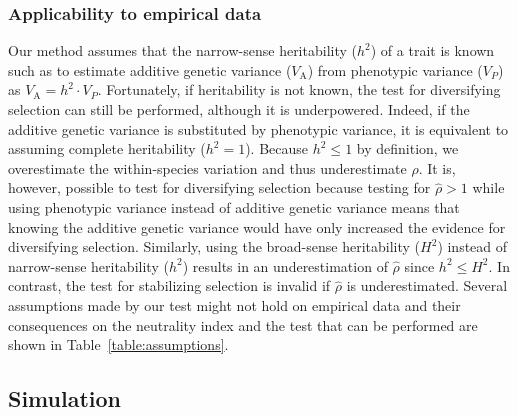 \documentclass{article}
\newcommand{\Multiply}{\cdot}
\newcommand{\Trait}{P}
\newcommand{\Heritability}{h^2}
\newcommand{\VarPhenotype}{V_{\Trait}}
\newcommand{\VarGenetic}{V_{\mathrm{A}}}
\newcommand{\EstNI}{\widehat{\rho}}
\begin{document}
\subsubsection*{Applicability to empirical data}

Our method assumes that the narrow-sense heritability ($\Heritability$) of a trait is known such as to estimate additive genetic variance ($\VarGenetic$) from phenotypic variance ($\VarPhenotype$) as $\VarGenetic = \Heritability \Multiply \VarPhenotype$.
Fortunately, if heritability is not known, the test for diversifying selection can still be performed, although it is underpowered.
Indeed, if the additive genetic variance is substituted by phenotypic variance, it is equivalent to assuming complete heritability ($\Heritability = 1$).
Because $\Heritability \leq 1$ by definition, we overestimate the within-species variation and thus underestimate $\EstNI$.
It is, however, possible to test for diversifying selection because testing for $\EstNI > 1$ while using phenotypic variance instead of additive genetic variance means that knowing the additive genetic variance would have only increased the evidence for diversifying selection.
Similarly, using the broad-sense heritability ($H^2$) instead of narrow-sense heritability ($\Heritability$) results in an underestimation of $\EstNI$ since $\Heritability \leq H^2$.
In contrast, the test for stabilizing selection is invalid if $\EstNI$ is underestimated.
Several assumptions made by our test might not hold on empirical data and their consequences on the neutrality index and the test that can be performed are shown in Table~\ref{table:assumptions}.

\subsection*{Simulation}\label{subsec:simulations}
\end{document}
